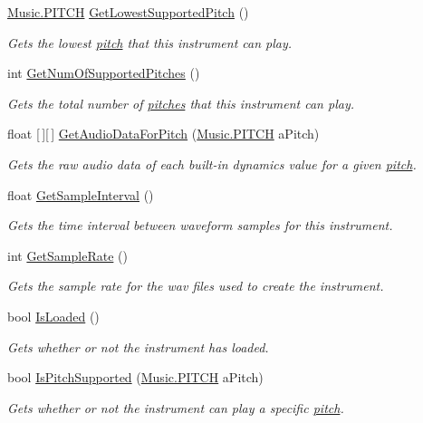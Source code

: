 \begin{DoxyCompactItemize}
\hyperlink{group___music_enums_ga508f69b199ea518f935486c990edac1d}{Music.\+P\+I\+T\+CH} \hyperlink{group___v_i_base_pub_func_gac42b3915bbfec60b83650abd701d0690}{Get\+Lowest\+Supported\+Pitch} ()
\begin{DoxyCompactList}\small\item\em Gets the lowest \hyperlink{group___music_enums_ga508f69b199ea518f935486c990edac1d}{pitch} that this instrument can play. \end{DoxyCompactList}\item 
int \hyperlink{group___v_i_base_pub_func_ga6ce5a7b3406269ea433be721d7d11177}{Get\+Num\+Of\+Supported\+Pitches} ()
\begin{DoxyCompactList}\small\item\em Gets the total number of \hyperlink{group___music_enums_ga508f69b199ea518f935486c990edac1d}{pitches} that this instrument can play. \end{DoxyCompactList}\item 
float \mbox{[}$\,$\mbox{]}\mbox{[}$\,$\mbox{]} \hyperlink{group___v_i_base_pub_func_gaf715f7c3bbd2f1a2fa543b2f0684f8a6}{Get\+Audio\+Data\+For\+Pitch} (\hyperlink{group___music_enums_ga508f69b199ea518f935486c990edac1d}{Music.\+P\+I\+T\+CH} a\+Pitch)
\begin{DoxyCompactList}\small\item\em Gets the raw audio data of each built-\/in dynamics value for a given \hyperlink{group___music_enums_ga508f69b199ea518f935486c990edac1d}{pitch}. \end{DoxyCompactList}\item 
float \hyperlink{group___v_i_base_pub_func_gabea22c3ab14c6989b9357da0bf052fbc}{Get\+Sample\+Interval} ()
\begin{DoxyCompactList}\small\item\em Gets the time interval between waveform samples for this instrument. \end{DoxyCompactList}\item 
int \hyperlink{group___v_i_base_pub_func_ga8be9d452abaf025dc7270c36b3cf379a}{Get\+Sample\+Rate} ()
\begin{DoxyCompactList}\small\item\em Gets the sample rate for the wav files used to create the instrument. \end{DoxyCompactList}\item 
bool \hyperlink{group___v_i_base_pub_func_gae8b5ac2e3402dfc50ea43f0e91fd9a29}{Is\+Loaded} ()
\begin{DoxyCompactList}\small\item\em Gets whether or not the instrument has loaded. \end{DoxyCompactList}\item 
bool \hyperlink{group___v_i_base_pub_func_ga89655451c108a7ad5cb96ab308e33937}{Is\+Pitch\+Supported} (\hyperlink{group___music_enums_ga508f69b199ea518f935486c990edac1d}{Music.\+P\+I\+T\+CH} a\+Pitch)
\begin{DoxyCompactList}\small\item\em Gets whether or not the instrument can play a specific \hyperlink{group___music_enums_ga508f69b199ea518f935486c990edac1d}{pitch}. \end{DoxyCompactList}\end{DoxyCompactItemize}
